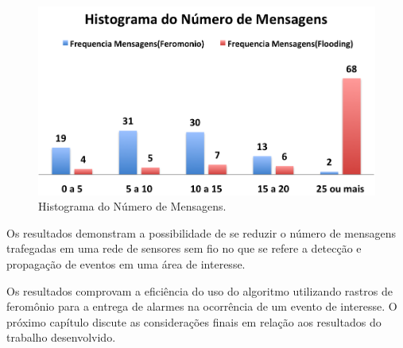\begin{figure}[h!]
 \centering
 \includegraphics[width=13cm]{results/hist_messages.png}
 \caption{Histograma do Número de Mensagens.}
  \label{fig:messages_hist}
 \end{figure}

Os resultados demonstram a possibilidade de se reduzir o número de mensagens trafegadas em uma rede de sensores sem fio no que se refere a detecção e propagação de eventos em uma área de interesse. 

Os resultados comprovam a eficiência do uso do algoritmo utilizando rastros de feromônio para a entrega de alarmes na ocorrência de um evento de interesse. O próximo capítulo discute as considerações finais em relação aos resultados do trabalho desenvolvido.
